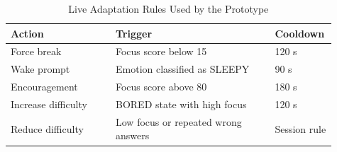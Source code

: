 \begin{table}[!htbp]
\caption{Live Adaptation Rules Used by the Prototype}
\label{tab:rules}
\centering
\scriptsize
\renewcommand{\arraystretch}{1.12}
\begin{tabular}{p{0.31\linewidth}p{0.47\linewidth}p{0.13\linewidth}}
\toprule
\textbf{Action} & \textbf{Trigger} & \textbf{Cooldown} \\
\midrule
Force break & Focus score below 15 & 120 s \\
Wake prompt & Emotion classified as SLEEPY & 90 s \\
Encouragement & Focus score above 80 & 180 s \\
Increase difficulty & BORED state with high focus & 120 s \\
Reduce difficulty & Low focus or repeated wrong answers & Session rule \\
\bottomrule
\end{tabular}
\end{table}
